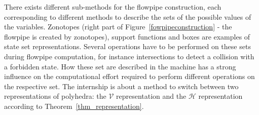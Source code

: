 There exists different sub-methods for the flowpipe construction, each corresponding to different methods to describe the sets of the possible values of the variables. Zonotopes (right part of Figure~\ref{fowpipeconstruction} - the flowpipe is created by zonotopes), support functions and boxes are examples of state set representations. Several operations have to be performed on these sets during flowpipe computation, for instance intersections to detect a collision with a forbidden state. How these set are described in the machine has a strong influence on the computational effort required to perform different operations on the respective set. The internship is about a method to switch between two representations of polyhedra: the $\mathcal{V}$ representation and the $\mathcal{H}$ representation according to Theorem~\ref{thm_representation}.%
 

